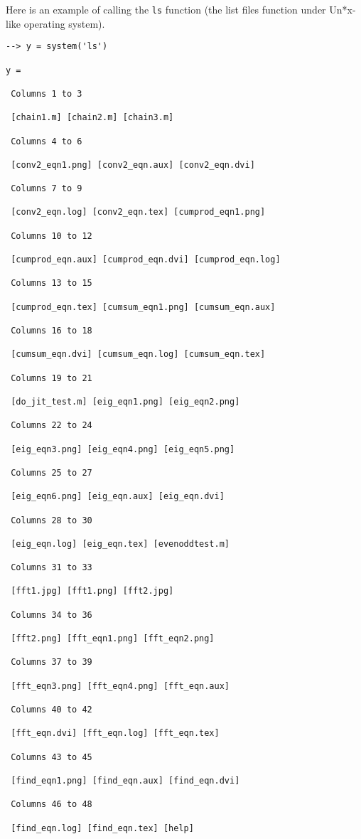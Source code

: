Here is an example of calling the \verb|ls| function (the
list files function under Un*x-like operating system).
\begin{verbatim}
--> y = system('ls')

y = 

 Columns 1 to 3

 [chain1.m] [chain2.m] [chain3.m] 

 Columns 4 to 6

 [conv2_eqn1.png] [conv2_eqn.aux] [conv2_eqn.dvi] 

 Columns 7 to 9

 [conv2_eqn.log] [conv2_eqn.tex] [cumprod_eqn1.png] 

 Columns 10 to 12

 [cumprod_eqn.aux] [cumprod_eqn.dvi] [cumprod_eqn.log] 

 Columns 13 to 15

 [cumprod_eqn.tex] [cumsum_eqn1.png] [cumsum_eqn.aux] 

 Columns 16 to 18

 [cumsum_eqn.dvi] [cumsum_eqn.log] [cumsum_eqn.tex] 

 Columns 19 to 21

 [do_jit_test.m] [eig_eqn1.png] [eig_eqn2.png] 

 Columns 22 to 24

 [eig_eqn3.png] [eig_eqn4.png] [eig_eqn5.png] 

 Columns 25 to 27

 [eig_eqn6.png] [eig_eqn.aux] [eig_eqn.dvi] 

 Columns 28 to 30

 [eig_eqn.log] [eig_eqn.tex] [evenoddtest.m] 

 Columns 31 to 33

 [fft1.jpg] [fft1.png] [fft2.jpg] 

 Columns 34 to 36

 [fft2.png] [fft_eqn1.png] [fft_eqn2.png] 

 Columns 37 to 39

 [fft_eqn3.png] [fft_eqn4.png] [fft_eqn.aux] 

 Columns 40 to 42

 [fft_eqn.dvi] [fft_eqn.log] [fft_eqn.tex] 

 Columns 43 to 45

 [find_eqn1.png] [find_eqn.aux] [find_eqn.dvi] 

 Columns 46 to 48

 [find_eqn.log] [find_eqn.tex] [help] 


\end{verbatim}
